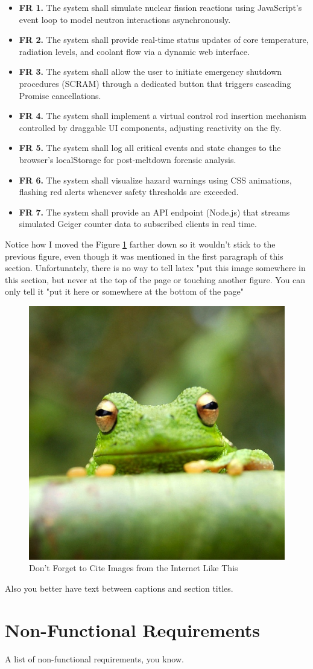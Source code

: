 \begin{itemize}
    \item \textbf{FR 1.} The system shall simulate nuclear fission reactions using JavaScript’s event loop to model neutron interactions asynchronously.
    \item \textbf{FR 2.} The system shall provide real-time status updates of core temperature, radiation levels, and coolant flow via a dynamic web interface.
    \item \textbf{FR 3.} The system shall allow the user to initiate emergency shutdown procedures (SCRAM) through a dedicated button that triggers cascading Promise cancellations.
    \item \textbf{FR 4.} The system shall implement a virtual control rod insertion mechanism controlled by draggable UI components, adjusting reactivity on the fly.
    \item \textbf{FR 5.} The system shall log all critical events and state changes to the browser's localStorage for post-meltdown forensic analysis.
    \item \textbf{FR 6.} The system shall visualize hazard warnings using CSS animations, flashing red alerts whenever safety thresholds are exceeded.
    \item \textbf{FR 7.} The system shall provide an API endpoint (Node.js) that streams simulated Geiger counter data to subscribed clients in real time.
\end{itemize}

Notice how I moved the Figure \ref{fig:frog3} farther down so it wouldn't stick to the previous figure,
even though it was mentioned in the first paragraph of this section.
Unfortunately, there is no way to tell latex 
"put this image somewhere in this section, but never at the top of the page
or touching another figure.
You can only tell it "put it here or somewhere at the bottom of the page"

\begin{figure}[hb]
\centering
\includegraphics[width=0.3\linewidth]{img/frog.jpg}
\caption{\label{fig:frog3}Don't Forget to Cite Images from the Internet Like This \cite{greenwade93}}
\end{figure}

Also you better have text between captions and section titles.
    
\section{Non-Functional Requirements}

A list of non-functional requirements, you know.